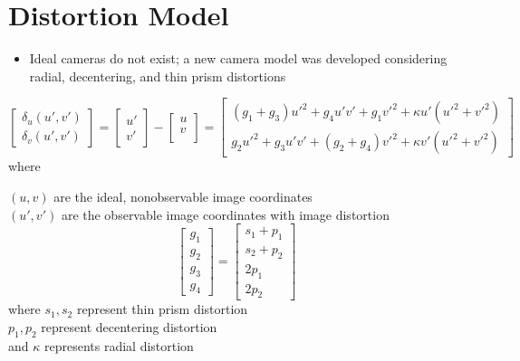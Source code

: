 \section{Distortion Model\cite{novel_approach_for_calibration}}
\begin{itemize}
    \item Ideal cameras do not exist; a new camera model was developed considering radial, decentering, and thin prism distortions
\end{itemize}

\[
    \begin{bmatrix}
        \delta_u(u', v') \\
        \delta_v(u', v')    
    \end{bmatrix}
    =
    \begin{bmatrix}
        u' \\
        v'
    \end{bmatrix}
    -
    \begin{bmatrix}
        u \\
        v \\
    \end{bmatrix}
    =
    \begin{bmatrix}
        (g_1 + g_3)u'^2 + g_4u'v' + g_1v'^2 + \kappa u'(u'^2 + v'^2) \\
        g_2u'^2 + g_3u'v' + (g_2 + g_4)v'^2 + \kappa v'(u'^2 + v'^2)
    \end{bmatrix}
\]
where\\
\begin{center}
    $(u,v)$ are the ideal, nonobservable image coordinates \\
    $(u', v')$ are the observable image coordinates with image distortion \\
    \[ \begin{bmatrix}
        g_1 \\
        g_2 \\
        g_3 \\
        g_4
    \end{bmatrix}
    =
    \begin{bmatrix}
        s_1 + p_1 \\
        s_2 + p_2 \\
        2p_1 \\
        2p_2
    \end{bmatrix}
    \]
    where $s_1, s_2$ represent thin prism distortion \\
    $p_1, p_2$ represent decentering distortion \\
    and $\kappa$ represents radial distortion
\end{center}